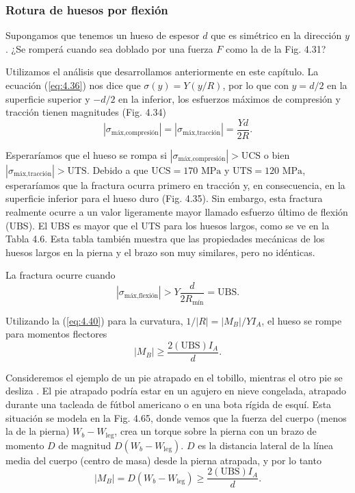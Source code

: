 \documentclass[12pt]{book}
\begin{document}
\subsubsection*{Rotura de huesos por flexión}

Supongamos que tenemos un hueso de espesor $d$ que es simétrico en la dirección $y$. ¿Se romperá cuando sea doblado por una fuerza $F$ como la de la Fig. 4.31?

Utilizamos el análisis que desarrollamos anteriormente en este capítulo. La ecuación (\ref{eq:4.36}) nos dice que $\sigma(y) = Y(y/R)$, por lo que con $y = d/2$ en la superficie superior y $-d/2$ en la inferior, los esfuerzos máximos de compresión y tracción tienen magnitudes (Fig. 4.34)
\begin{equation}
|\sigma_{\text{máx,compresión}}| = |\sigma_{\text{máx,tracción}}| = \frac{Yd}{2R}.
\label{eq:4.80}
\end{equation}

Esperaríamos que el hueso se rompa si $|\sigma_{\text{máx,compresión}}| > \text{UCS}$ o bien $|\sigma_{\text{máx,tracción}}| > \text{UTS}$. Debido a que $\text{UCS} = 170\text{ MPa}$ y $\text{UTS} = 120\text{ MPa}$, esperaríamos que la fractura ocurra primero en tracción y, en consecuencia, en la superficie inferior para el hueso duro (Fig. 4.35). Sin embargo, esta fractura realmente ocurre a un valor ligeramente mayor llamado esfuerzo último de flexión (UBS). El UBS es mayor que el UTS para los huesos largos, como se ve en la Tabla 4.6. Esta tabla también muestra que las propiedades mecánicas de los huesos largos en la pierna y el brazo son muy similares, pero no idénticas.

La fractura ocurre cuando
\begin{equation}
|\sigma_{\text{máx,flexión}}| > Y \frac{d}{2R_{\text{mín}}} = \text{UBS}.
\label{eq:4.81}
\end{equation}

Utilizando la (\ref{eq:4.40}) para la curvatura, $1/|R| = |M_B|/Y I_A$, el hueso se rompe para momentos flectores
\begin{equation}
|M_B| \ge \frac{2(\text{UBS})I_A}{d}.
\label{eq:4.82}
\end{equation}

Consideremos el ejemplo de un pie atrapado en el tobillo, mientras el otro pie se desliza \cite{6}. El pie atrapado podría estar en un agujero en nieve congelada, atrapado durante una tacleada de fútbol americano o en una bota rígida de esquí. Esta situación se modela en la Fig. 4.65, donde vemos que la fuerza del cuerpo (menos la de la pierna) $W_b - W_{\text{leg}}$, crea un torque sobre la pierna con un brazo de momento $D$ de magnitud $D(W_b - W_{\text{leg}})$. $D$ es la distancia lateral de la línea media del cuerpo (centro de masa) desde la pierna atrapada, y por lo tanto
\begin{equation}
|M_B| = D(W_b - W_{\text{leg}}) \ge \frac{2(\text{UBS})I_A}{d}.
\label{eq:4.83}
\end{equation}
\end{document}
